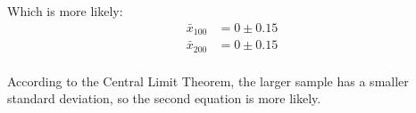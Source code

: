 \documentclass[letterpaper,landscape]{exam}
\begin{document}
\begin{enumerate}
\begin{solution}
        Which is more likely:
        \begin{align*}
          \bar{x}_{100} &= 0 \pm 0.15 \\
          \bar{x}_{200} &= 0 \pm 0.15 \\
        \end{align*}

        According to the Central Limit Theorem, the larger sample has a smaller
        standard deviation, so the second equation is more likely.



      \end{solution}
  \end{enumerate}



\end{document}
